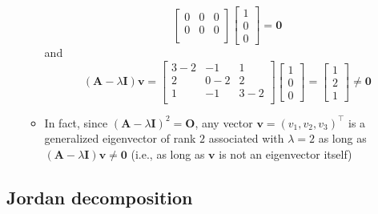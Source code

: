 \documentclass[12pt,a4paper]{article}
\begin{document}
\begin{itemize}
\begin{itemize}
\begin{equation}
\begin{bmatrix}
        0 & 0 & 0 \\
        0 & 0 & 0 \\
      \end{bmatrix}
      \begin{bmatrix}
        1 \\ 0 \\ 0
      \end{bmatrix}
      = \bm{0}
    \end{equation}
    and
    \begin{equation}\nonumber%
      (\bm{A}-\lambda\bm{I})\bm{v} = 
      \begin{bmatrix}
        3-2 & -1 & 1 \\
        2 & 0-2 & 2 \\
        1 & -1 & 3-2 \\
      \end{bmatrix}
      \begin{bmatrix}
        1 \\ 0 \\ 0
      \end{bmatrix}
      = 
      \begin{bmatrix}
        1 \\ 2 \\ 1
      \end{bmatrix}
      \neq \bm{0}
    \end{equation}
  \item In fact,
    since $(\bm{A}-\lambda \bm{I})^{2}=\bm{O}$,
    any vector $\bm{v}=(v_{1}, v_{2}, v_{3})^{\top}$ is
    a generalized eigenvector of rank $2$ associated with $\lambda=2$
    as long as $(\bm{A}-\lambda \bm{I})\bm{v}\neq \bm{0}$
    (i.e., as long as $\bm{v}$ is not an eigenvector itself)
  \end{itemize}

\end{itemize}

\subsection{Jordan decomposition}
\end{document}
